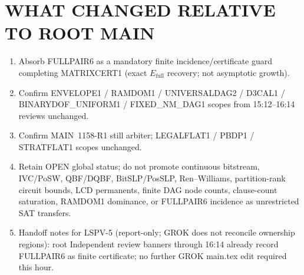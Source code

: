 \documentclass[11pt]{article}
\begin{document}
\section*{WHAT CHANGED RELATIVE TO ROOT MAIN}
\begin{enumerate}
\item Absorb FULLPAIR6 as a mandatory finite incidence/certificate guard completing
MATRIXCERT1 (exact $E_{\mathrm{full}}$ recovery; not asymptotic growth).
\item Confirm ENVELOPE1 / RAMDOM1 / UNIVERSALDAG2 / D3CAL1 / BINARYDOF\_UNIFORM1 /
FIXED\_NM\_DAG1 scopes from 15:12--16:14 reviews unchanged.
\item Confirm MAIN~1158-R1 still arbiter; LEGALFLAT1 / PBDP1 / STRATFLAT1 scopes
unchanged.
\item Retain OPEN global status; do not promote continuous bitstream, IVC/PoSW,
QBF/DQBF, BitSLP/PosSLP, Ren--Williams, partition-rank circuit bounds, LCD
permanents, finite DAG node counts, clause-count saturation, RAMDOM1 dominance,
or FULLPAIR6 incidence as unrestricted SAT transfers.
\item Handoff notes for LSPV-5 (report-only; GROK does not reconcile ownership
regions): root Independent review banners through 16:14 already record FULLPAIR6
as finite certificate; no further GROK main.tex edit required this hour.
\end{enumerate}
\end{document}
